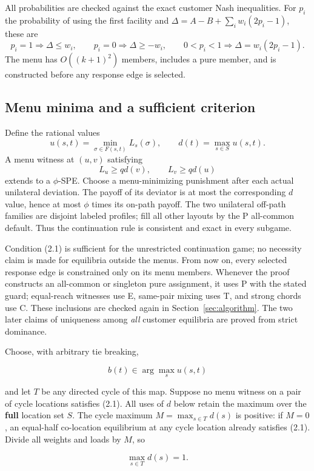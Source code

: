 \documentclass[11pt,a4paper]{article}
\begin{document}
All probabilities are checked against the exact customer Nash inequalities.
For $p_i$ the probability of using the first facility and
$\Delta=A-B+\sum_iw_i(2p_i-1)$, these are
\[
 p_i=1\Rightarrow\Delta\le w_i,\qquad
 p_i=0\Rightarrow\Delta\ge-w_i,\qquad
 0<p_i<1\Rightarrow\Delta=w_i(2p_i-1).
\]
The menu has $O((k+1)^2)$ members, includes a pure member, and is constructed
before any response edge is selected.

\subsection{Menu minima and a sufficient criterion}
Define the rational values
\[
 u(s,t)=\min_{\sigma\in F(s,t)}L_s(\sigma),\qquad
 d(t)=\max_{s\in S}u(s,t).
\]
A menu witness at $(u,v)$ satisfying
\[
 L_u\ge qd(v),\qquad L_v\ge qd(u)                       \tag{2.1}
\]
extends to a $\phi$-SPE. Choose a menu-minimizing punishment after each
actual unilateral deviation. The payoff of its deviator is at most the
corresponding $d$ value, hence at most $\phi$ times its on-path payoff.
The two unilateral off-path families are disjoint labeled profiles; fill
all other layouts by the P all-common default. Thus the continuation rule
is consistent and exact in every subgame.

Condition (2.1) is sufficient for the unrestricted continuation game; no
necessity claim is made for equilibria outside the menus. From now on,
every selected response edge is constrained only on its menu members.
Whenever the proof constructs an all-common or singleton pure assignment,
it uses P with the stated guard; equal-reach witnesses use E, same-pair
mixing uses T, and strong chords use C. These inclusions are checked again
in Section~\ref{sec:algorithm}. The two later claims of uniqueness among
\emph{all} customer equilibria are proved from strict dominance.

Choose, with arbitrary tie breaking,

\[
b(t)\in\arg\max_s u(s,t)
\]

and let \(T\) be any directed cycle of this map. Suppose no menu witness on a pair of cycle locations satisfies (2.1). All uses of \(d\) below retain the maximum over the \textbf{full} location set \(S\). The cycle maximum \(M=\max_{s\in T}d(s)\) is positive: if \(M=0\), an equal-half co-location equilibrium at any cycle location already satisfies (2.1). Divide all weights and loads by \(M\), so

\[
\max_{s\in T}d(s)=1.
\]
\end{document}

